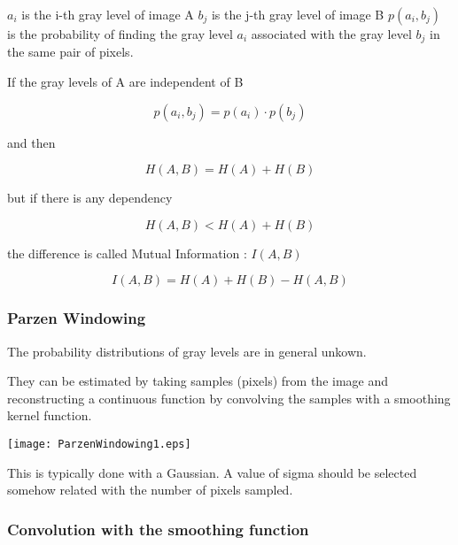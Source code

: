 \begin{center}
$a_{i}$ is the i-th gray level of image A
$b_{j}$ is the j-th gray level of image B $p\left( a_{i},b_{j}\right)$ is the
probability of finding the gray level $a_{i}$ associated with the gray level
$b_{j}$ in the same pair of pixels.
\end{center}


If the gray levels of A are independent of B

\begin{equation}
p\left( a_{i},b_{j}\right) =p\left( a_{i}\right) \cdot p\left( b_{j}\right) 
\end{equation}


and then 

\begin{equation}
H(A,B)=H(A)+H(B)
\end{equation}


but if there is any dependency

\begin{equation}
H(A,B)<H(A)+H(B)
\end{equation}


the difference is called Mutual Information : \( I(A,B) \)

\begin{equation}
I(A,B)=H(A)+H(B)-H(A,B)
\end{equation}


\subsubsection{Parzen Windowing}

The probability distributions of gray levels are in general unkown.

They can be estimated by taking samples (pixels) from the image and
reconstructing a continuous function by convolving the samples with a smoothing
kernel function.

\texttt{[image: ParzenWindowing1.eps]}

This is typically done with a Gaussian. A value of sigma should be selected
somehow related with the number of pixels sampled.  

\subsubsection{Convolution with the
smoothing function}


